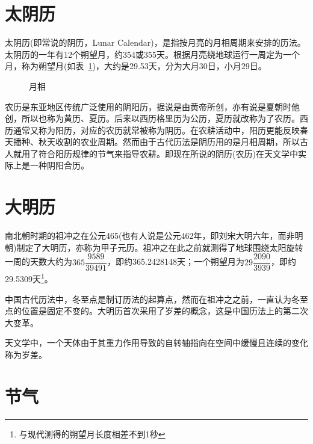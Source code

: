 \section{太阴历}
\label{sec:tai-yin-calendar}

太阴历(即常说的阴历，Lunar Calendar)，是指按月亮的月相周期来安排的历法。太阴历的一年有12个朔望月，约354或355天。根据月亮绕地球运行一周定为一个月，称为朔望月(如表~\ref{fig:lunar-phases})，大约是29.53天，分为大月30日，小月29日。

\begin{figure}[htbp]
  \centering
  \scalebox{0.75}{}
  \caption{月相}
  \label{fig:lunar-phases}
\end{figure}

农历是东亚地区传统广泛使用的阴阳历，据说是由黄帝所创，亦有说是夏朝时他创，所以也称为黄历、夏历。后来以西历格里历为公历，夏历就改称为了农历。西历通常又称为阳历，对应的农历就常被称为阴历。在农耕活动中，阳历更能反映春天播种、秋天收割的农业周期。然而由于古代历法是阴历用的是月相周期，所以古人就用了符合阳历规律的节气来指导农耕。即现在所说的阴历(农历)在天文学中实际上是一种阴阳合历。


\section{大明历}
\label{sec:da-ming-calendar}

南北朝时期的祖冲之在公元465(也有人说是公元462年，即刘宋大明六年，而非明朝)制定了大明历，亦称为甲子元历。祖冲之在此之前就测得了地球围绕太阳旋转一周的天数大约为$365\dfrac{9589}{39491}$，即约365.2428148天；一个朔望月为$29\dfrac{2090}{3939}$，即约29.5309天\footnote{与现代测得的朔望月长度相差不到1秒}。

中国古代历法中，冬至点是制订历法的起算点，然而在祖冲之之前，一直认为冬至点的位置是固定不变的。大明历首次采用了岁差的概念，这是中国历法上的第二次大变革。

\begin{definition}
  天文学中，一个天体由于其重力作用导致的自转轴指向在空间中缓慢且连续的变化称为岁差。
\end{definition}


\section{节气}
\label{sec:jie-qi}

